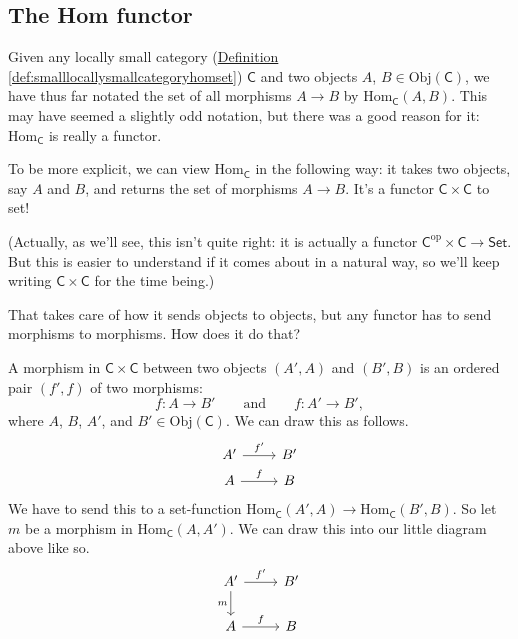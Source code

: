 \documentclass[a4paper,10pt]{scrreprt}
\newcommand{\Obj}{\mathrm{Obj}}
\newcommand{\Hom}{\mathrm{Hom}}
\theoremstyle{definition}
\theoremstyle{plain}
\theoremstyle{remark}
\begin{document}
\subsection{The Hom functor} \label{section:homfunctor}
Given any locally small category (\hyperref[def:smalllocallysmallcategoryhomset]{Definition \ref*{def:smalllocallysmallcategoryhomset}}) $\mathsf{C}$ and two objects $A$, $B \in \Obj(\mathsf{C})$, we have thus far notated the set of all morphisms $A \to B$ by $\Hom_{\mathsf{C}}(A, B)$. This may have seemed a slightly odd notation, but there was a good reason for it: $\Hom_{\mathsf{C}}$ is really a functor.

To be more explicit, we can view $\Hom_{\mathsf{C}}$ in the following way: it takes two objects, say $A$ and $B$, and returns the set of morphisms $A \to B$. It's a functor $\mathsf{C} \times \mathsf{C}$ to set!

(Actually, as we'll see, this isn't quite right: it is actually a functor $\mathsf{C}^{\text{op}} \times \mathsf{C} \to \mathsf{Set}$. But this is easier to understand if it comes about in a natural way, so we'll keep writing $\mathsf{C} \times \mathsf{C}$ for the time being.)

That takes care of how it sends objects to objects, but any functor has to send morphisms to morphisms. How does it do that?

A morphism in $\mathsf{C} \times \mathsf{C}$ between two objects $(A', A)$ and $(B', B)$ is an ordered pair $(f', f)$ of two morphisms:
\begin{equation*}
  f\colon A \to B'\qquad\text{and}\qquad f\colon A' \to B',
\end{equation*}
where $A$, $B$, $A'$, and $B' \in \Obj(\mathsf{C})$. We can draw this as follows.
\begin{equation*}
  \begin{tikzcd}[row sep=tiny]
    A' 
    \arrow[r, "f'"]
    & B'
    \\
    A
    \arrow[r, "f"]
    & B
  \end{tikzcd}
\end{equation*}
We have to send this to a set-function $\Hom_{\mathsf{C}}(A', A) \to \Hom_{\mathsf{C}}(B', B)$. So let $m$ be a morphism in $\Hom_{\mathsf{C}}(A, A')$. We can draw this into our little diagram above like so.
\begin{equation*}
  \begin{tikzcd}
    A' 
    \arrow[r, "f'"]
    \arrow[d, swap, "m"]
    & B'
    \\
    A
    \arrow[r, "f"]
    & B
  \end{tikzcd}
\end{equation*}
\end{document}
